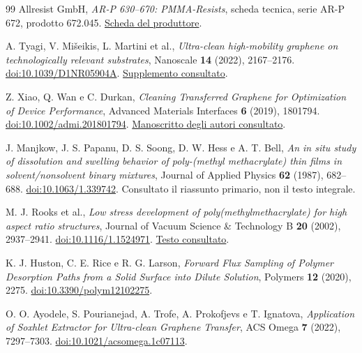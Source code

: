 \documentclass[11pt,reqno]{amsart}
\numberwithin{equation}{section}
\begin{document}
\begin{thebibliography}{99}
Allresist GmbH, \emph{AR-P 630--670: PMMA-Resists}, scheda tecnica,
serie AR-P 672, prodotto 672.045.
\href{https://www.allresist.de/wp-content/uploads/2020/03/AR-P630-670_Deutsch_Allresist_Produktinformation.pdf}{Scheda del produttore}.

A. Tyagi, V. Mi\v{s}eikis, L. Martini et al.,
\emph{Ultra-clean high-mobility graphene on technologically relevant substrates},
Nanoscale \textbf{14} (2022), 2167--2176.
\href{https://doi.org/10.1039/D1NR05904A}{doi:10.1039/D1NR05904A}.
\href{https://www.rsc.org/suppdata/d1/nr/d1nr05904a/d1nr05904a1.pdf}{Supplemento consultato}.

Z. Xiao, Q. Wan e C. Durkan,
\emph{Cleaning Transferred Graphene for Optimization of Device Performance},
Advanced Materials Interfaces \textbf{6} (2019), 1801794.
\href{https://doi.org/10.1002/admi.201801794}{doi:10.1002/admi.201801794}.
\href{https://www.repository.cam.ac.uk/handle/1810/291256}{Manoscritto degli autori consultato}.

J. Manjkow, J. S. Papanu, D. S. Soong, D. W. Hess e A. T. Bell,
\emph{An in situ study of dissolution and swelling behavior of
poly-(methyl methacrylate) thin films in solvent/nonsolvent binary mixtures},
Journal of Applied Physics \textbf{62} (1987), 682--688.
\href{https://doi.org/10.1063/1.339742}{doi:10.1063/1.339742}.
Consultato il riassunto primario, non il testo integrale.

M. J. Rooks et al., \emph{Low stress development of poly(methylmethacrylate)
for high aspect ratio structures}, Journal of Vacuum Science \& Technology B
\textbf{20} (2002), 2937--2941.
\href{https://doi.org/10.1116/1.1524971}{doi:10.1116/1.1524971}.
\href{https://nano.yale.edu/sites/default/files/files/pmma_develop_ipa_water.pdf}{Testo consultato}.

K. J. Huston, C. E. Rice e R. G. Larson,
\emph{Forward Flux Sampling of Polymer Desorption Paths from a Solid Surface
into Dilute Solution}, Polymers \textbf{12} (2020), 2275.
\href{https://doi.org/10.3390/polym12102275}{doi:10.3390/polym12102275}.

O. O. Ayodele, S. Pourianejad, A. Trofe, A. Prokofjevs e T. Ignatova,
\emph{Application of Soxhlet Extractor for Ultra-clean Graphene Transfer},
ACS Omega \textbf{7} (2022), 7297--7303.
\href{https://doi.org/10.1021/acsomega.1c07113}{doi:10.1021/acsomega.1c07113}.


\end{thebibliography}
\end{document}
